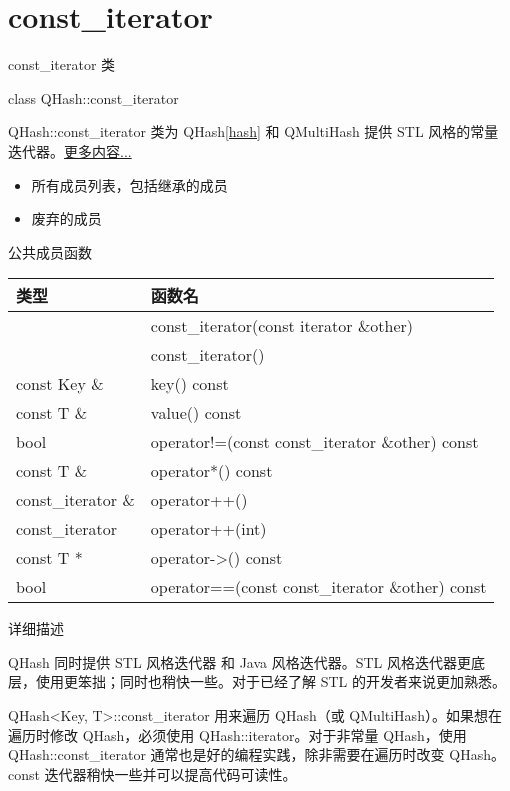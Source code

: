 \chapter{const\_iterator}

const\_iterator 类

class QHash::const\_iterator

QHash::const\_iterator 类为 QHash\ref{hash} 和 QMultiHash 提供 STL 风格的常量迭代器。\href{https://github.com/JackLovel/QtDocumentCN/blob/master/Src/H/QHash/QHash-const-iterator.md#%E8%AF%A6%E7%BB%86%E6%8F%8F%E8%BF%B0}{更多内容...}

\begin{itemize}
\item 所有成员列表，包括继承的成员
\item 废弃的成员
\end{itemize}

\splitLine

公共成员函数

\begin{tabular}{|l|l|}
\hline
类型	&函数名\\
\hline
 	&const\_iterator(const iterator \&other)\\
\hline
	&const\_iterator()\\
\hline
const Key \& &	key() const\\
\hline
const T \& &	value() const\\
\hline
bool &	operator!=(const const\_iterator \&other) const\\
\hline
const T \& &	operator*() const\\
\hline
const\_iterator \& &	operator++()\\
\hline
const\_iterator 	&operator++(int)\\
\hline
const T * 	&operator->() const\\
\hline
bool 	&operator==(const const\_iterator \&other) const\\
\hline
\end{tabular}


\splitLine

详细描述

QHash 同时提供 STL 风格迭代器 和 Java 风格迭代器。STL 风格迭代器更底层，使用更笨拙；同时也稍快一些。对于已经了解 STL 的开发者来说更加熟悉。

QHash<Key, T>::const\_iterator 用来遍历 QHash（或 QMultiHash）。如果想在遍历时修改 QHash，必须使用 QHash::iterator。对于非常量 QHash，使用 QHash::const\_iterator 通常也是好的编程实践，除非需要在遍历时改变 QHash。const 迭代器稍快一些并可以提高代码可读性。

